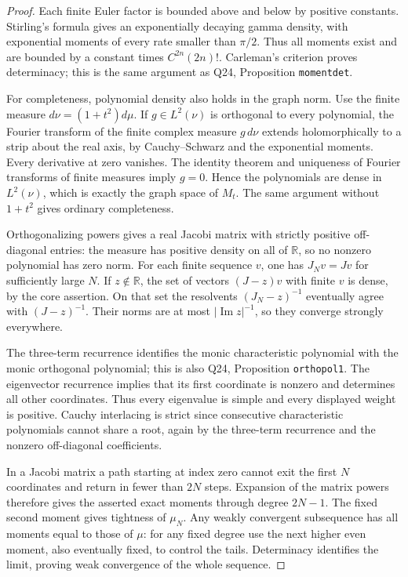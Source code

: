 \begin{proof}
Each finite Euler factor is bounded above and below by positive
constants.  Stirling's formula gives an exponentially decaying gamma
density, with exponential moments of every rate smaller than
\(\pi/2\).  Thus all moments exist and are bounded by a constant
times \(C^{2n}(2n)!\).  Carleman's criterion proves determinacy;
this is the same argument as Q24, Proposition \texttt{momentdet}.

For completeness, polynomial density also holds in the graph norm.
Use the finite measure \(d\nu=(1+t^2)d\mu\).  If \(g\in L^2(\nu)\)
is orthogonal to every polynomial, the Fourier transform of the finite
complex measure \(g\,d\nu\) extends holomorphically to a strip about
the real axis, by Cauchy--Schwarz and the exponential moments.  Every
derivative at zero vanishes.  The identity theorem and uniqueness of
Fourier transforms of finite measures imply \(g=0\).  Hence the
polynomials are dense in \(L^2(\nu)\), which is exactly the graph
space of \(M_t\).  The same argument without \(1+t^2\) gives
ordinary completeness.

Orthogonalizing powers gives a real Jacobi matrix with strictly
positive off-diagonal entries: the measure has positive density on
all of \(\mathbb R\), so no nonzero polynomial has zero norm.  For
each finite sequence \(v\), one has \(J_Nv=Jv\) for sufficiently
large \(N\).  If \(z\notin\mathbb R\), the set of vectors
\((J-z)v\) with finite \(v\) is dense, by the core assertion.
On that set the resolvents \((J_N-z)^{-1}\) eventually agree with
\((J-z)^{-1}\).  Their norms are at most
\(|\operatorname{Im}z|^{-1}\), so they converge strongly everywhere.

The three-term recurrence identifies the monic characteristic
polynomial with the monic orthogonal polynomial; this is also Q24,
Proposition \texttt{orthopol1}.  The eigenvector recurrence implies
that its first coordinate is nonzero and determines all other
coordinates.  Thus every eigenvalue is simple and every displayed
weight is positive.  Cauchy interlacing is strict since consecutive
characteristic polynomials cannot share a root, again by the
three-term recurrence and the nonzero off-diagonal coefficients.

In a Jacobi matrix a path starting at index zero cannot exit the
first \(N\) coordinates and return in fewer than \(2N\) steps.
Expansion of the matrix powers therefore gives the asserted exact
moments through degree \(2N-1\).  The fixed second moment gives
tightness of \(\mu_N\).  Any weakly convergent subsequence has all
moments equal to those of \(\mu\): for any fixed degree use the
next higher even moment, also eventually fixed, to control the tails.
Determinacy identifies the limit, proving weak convergence of the
whole sequence.


\end{proof}
